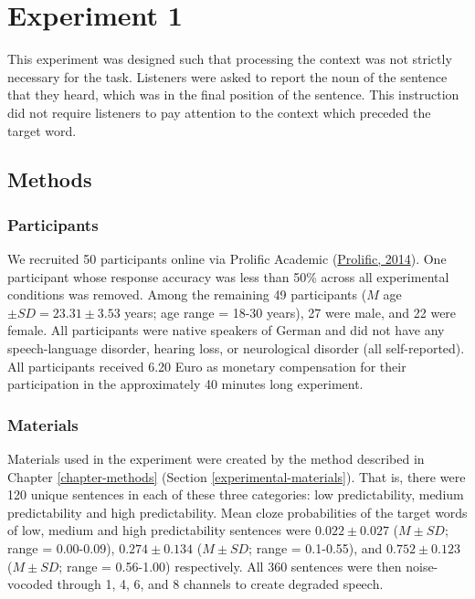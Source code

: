 \documentclass[a4paper, nobind]{templates/ociamthesis}
\begin{document}
\hypertarget{experiment1a}{%
\section{Experiment 1}\label{experiment1a}}

This experiment was designed such that processing the context was not strictly necessary for the task.
Listeners were asked to report the noun of the sentence that they heard, which was in the final position of the sentence.
This instruction did not require listeners to pay attention to the context which preceded the target word.

\hypertarget{methods}{%
\subsection{Methods}\label{methods}}

\hypertarget{participants}{%
\subsubsection{Participants}\label{participants}}

We recruited 50 participants online via Prolific Academic (\protect\hyperlink{ref-Prolific}{Prolific, 2014}).
One participant whose response accuracy was less than 50\% across all experimental conditions was removed.
Among the remaining 49 participants (\(M\) age \(\pm SD=23.31\pm 3.53\) years; age range = 18-30 years), 27 were male, and 22 were female.
All participants were native speakers of German and did not have any speech-language disorder, hearing loss, or neurological disorder (all self-reported).
All participants received 6.20 Euro as monetary compensation for their participation in the approximately 40 minutes long experiment.

\hypertarget{materials}{%
\subsubsection{Materials}\label{materials}}

Materials used in the experiment were created by the method described in Chapter \ref{chapter-methods} (Section \ref{experimental-materials}).
That is, there were 120 unique sentences in each of these three categories: low predictability, medium predictability and high predictability.
Mean cloze probabilities of the target words of low, medium and high predictability sentences were \(0.022\pm0.027\) (\(M\pm SD\); range = 0.00-0.09), \(0.274\pm0.134\) (\(M\pm SD\); range = 0.1-0.55), and \(0.752\pm0.123\) (\(M\pm SD\); range = 0.56-1.00) respectively.
All 360 sentences were then noise-vocoded through 1, 4, 6, and 8 channels to create degraded speech.
\end{document}
